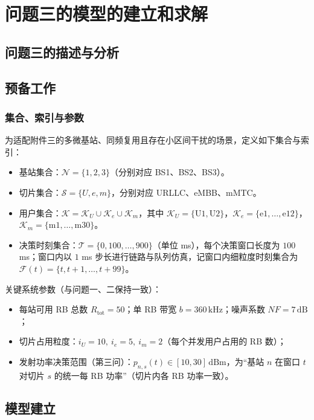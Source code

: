 \section{问题三的模型的建立和求解}
\subsection{问题三的描述与分析}

\subsection{预备工作}
\subsubsection{集合、索引与参数}

为适配附件三的多微基站、同频复用且存在小区间干扰的场景，定义如下集合与索引：

\begin{itemize}
  \item 基站集合：$\mathcal{N}=\{1,2,3\}$（分别对应 BS1、BS2、BS3）。
  \item 切片集合：$\mathcal{S}=\{U,e,m\}$，分别对应 URLLC、eMBB、mMTC。
  \item 用户集合：$\mathcal{K}=\mathcal{K}_U\cup\mathcal{K}_e\cup\mathcal{K}_m$，其中 $\mathcal{K}_U=\{\mathrm{U1},\mathrm{U2}\}$，$\mathcal{K}_e=\{\mathrm{e1},\dots,\mathrm{e12}\}$，$\mathcal{K}_m=\{\mathrm{m1},\dots,\mathrm{m30}\}$。
  \item 决策时刻集合：$\mathcal{T}=\{0,100,\dots,900\}$（单位 ms），每个决策窗口长度为 $100$ ms；窗口内以 $1$ ms 步长进行链路与队列仿真，记窗口内细粒度时刻集合为 $\mathcal{F}(t)=\{t,t+1,\dots,t+99\}$。
\end{itemize}

关键系统参数（与问题一、二保持一致）：

\begin{itemize}
  \item 每站可用 RB 总数 $R_{\text{tot}}=50$；单 RB 带宽 $b=360\,\mathrm{kHz}$；噪声系数 $NF=7\,\mathrm{dB}$；
  \item 切片占用粒度：$i_U=10,\ i_e=5,\ i_m=2$（每个并发用户占用的 RB 数）；
  \item 发射功率决策范围（第三问）：$p_{n,s}(t)\in[10,30]\,\mathrm{dBm}$，为“基站 $n$ 在窗口 $t$ 对切片 $s$ 的统一每 RB 功率”（切片内各 RB 功率一致）。
\end{itemize}

\subsection{模型建立}

